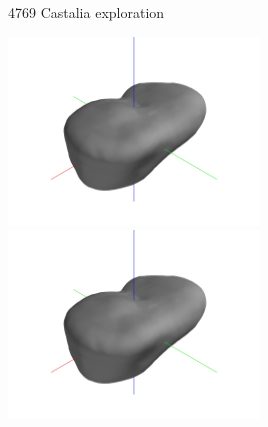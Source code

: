 \begin{frame}{4769 Castalia exploration}

\begin{center}
    \href{https://youtu.be/EMlYvBGN8S0}{\includegraphics[trim={20cm 10cm 20cm 10cm},clip,keepaspectratio,width=0.5\textwidth,height=\textheight]{figures/computational_geometry/dynamic_exploration/castalia/partial_14998.jpg}}%
        \href{https://youtu.be/jz-_SIi4a5A}{\includegraphics[trim={20cm 10cm 20cm 10cm},clip,keepaspectratio,width=0.5\textwidth,height=\textheight]{figures/computational_geometry/dynamic_exploration/castalia/partial_14998.jpg}}
\end{center}

\end{frame}

